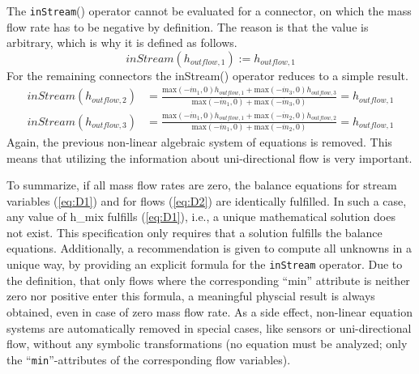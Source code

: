 The \lstinline!inStream!() operator cannot be evaluated for a connector, on which
the mass flow rate has to be negative by definition. The reason is that
the value is arbitrary, which is why it is defined as follows.
\begin{equation*}
inStream(h_{outflow,1}):=h_{outflow,1}
\end{equation*}
For the remaining connectors the inStream() operator reduces to a simple
result.
\begin{eqnarray*}
inStream(h_{outflow,2})&=\frac{\text{max}(-\dot{m}_1,0)h_{outflow,1}+\text{max}(-\dot{m}_3,0)h_{outflow,3}}{\text{max}(-\dot{m}_1,0)+\text{max}(-\dot{m}_3,0)}=h_{outflow,1}\\
inStream(h_{outflow,3})&=\frac{\text{max}(-\dot{m}_1,0)h_{outflow,1}+\text{max}(-\dot{m}_2,0)h_{outflow,2}}{\text{max}(-\dot{m}_1,0)+\text{max}(-\dot{m}_2,0)}=h_{outflow,1}
\end{eqnarray*}
Again, the previous non-linear algebraic system of equations is removed.
This means that utilizing the information about uni-directional flow is
very important.

To summarize, if all mass flow rates are zero, the balance equations for
stream variables (\ref{eq:D1}) and for flows (\ref{eq:D2}) are identically fulfilled. In
such a case, any value of h\_mix fulfills (\ref{eq:D1}), i.e., a unique
mathematical solution does not exist. This specification only requires
that a solution fulfills the balance equations. Additionally, a
recommendation is given to compute all unknowns in a unique way, by
providing an explicit formula for the \lstinline!inStream! operator. Due to the
definition, that only flows where the corresponding ``min'' attribute is
neither zero nor positive enter this formula, a meaningful physcial
result is always obtained, even in case of zero mass flow rate. As a
side effect, non-linear equation systems are automatically removed in
special cases, like sensors or uni-directional flow, without any
symbolic transformations (no equation must be analyzed; only the
``\lstinline!min!''-attributes of the corresponding flow variables).
